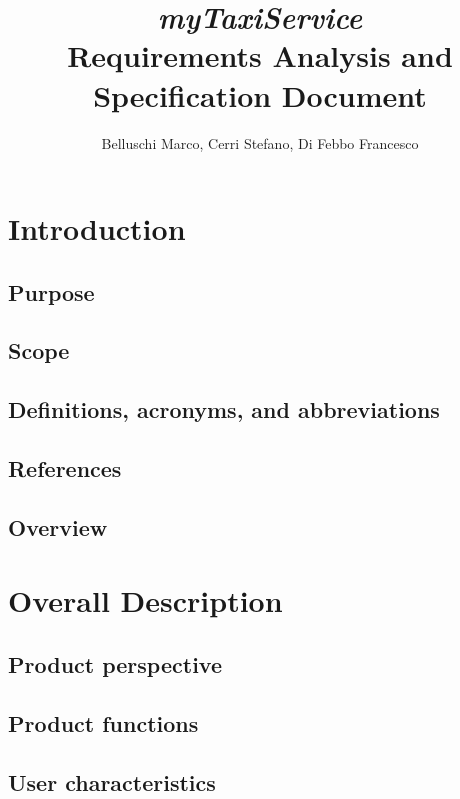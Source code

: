 \documentclass[]{report}
\title{{\Huge\textit{myTaxiService}}\\Requirements Analysis and Specification Document}
\author{Belluschi Marco, Cerri Stefano, Di Febbo Francesco}
\begin{document}
\maketitle
\tableofcontents

\chapter{Introduction}

\section{Purpose}


\section{Scope}


\section{Definitions, acronyms, and abbreviations}


\section{References}


\section{Overview}


\chapter{Overall Description}

\section{Product perspective}


\section{Product functions}


\section{User characteristics}

\end{document}
